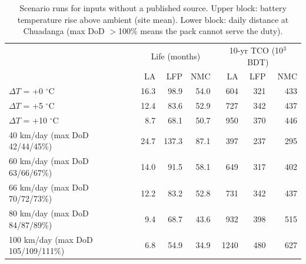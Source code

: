 \begin{table}[t]
\centering\small
\caption{Scenario runs for inputs without a published source. Upper block: battery temperature rise above ambient (site mean). Lower block: daily distance at Chuadanga (max DoD $>$100\% means the pack cannot serve the duty).}
\label{tab:scen}
\begin{tabular}{lrrrrrr}
\toprule
 & \multicolumn{3}{c}{Life (months)} & \multicolumn{3}{c}{10-yr TCO (10$^3$ BDT)} \\
 & LA & LFP & NMC & LA & LFP & NMC \\
\midrule
$\Delta T$ = +0 $^\circ$C & 16.3 & 98.9 & 54.0 & 604 & 321 & 433 \\
$\Delta T$ = +5 $^\circ$C & 12.4 & 83.6 & 52.9 & 727 & 342 & 437 \\
$\Delta T$ = +10 $^\circ$C & 8.7 & 68.1 & 50.7 & 950 & 370 & 446 \\
\midrule
40 km/day (max DoD 42/44/45\%) & 24.7 & 137.3 & 87.1 & 397 & 237 & 295 \\
60 km/day (max DoD 63/66/67\%) & 14.0 & 91.5 & 58.1 & 649 & 317 & 402 \\
66 km/day (max DoD 70/72/73\%) & 12.2 & 83.2 & 52.8 & 731 & 342 & 437 \\
80 km/day (max DoD 84/87/89\%) & 9.4 & 68.7 & 43.6 & 932 & 398 & 515 \\
100 km/day (max DoD 105/109/111\%) & 6.8 & 54.9 & 34.9 & 1240 & 480 & 627 \\
\bottomrule
\end{tabular}
\end{table}

